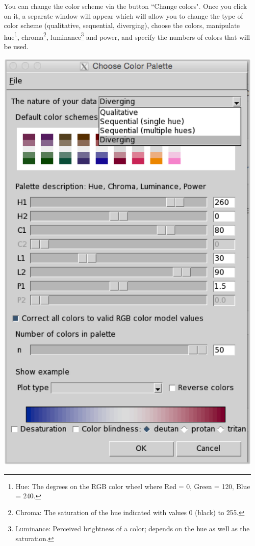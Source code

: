 \documentclass[letterpaper, twocolumn, 9pt]{article}
\begin{document}
You can change the color scheme via the button \textsf{``Change colors"}.
Once you click on it, a separate window will appear which will allow you to change the type of color scheme (qualitative, sequential, diverging), choose the colors, manipulate hue\footnote{Hue: The degrees on the RGB color wheel where Red = 0, Green = 120, Blue = 240.}, chroma\footnote{Chroma: The saturation of the hue indicated with values 0 (black) to 255.}, luminance\footnote{Luminance: Perceived brightness of a color; depends on the hue as well as the saturation.} and power, and specify the numbers of colors that will be used.
\begin{center}
\includegraphics[scale=.4]{figures/ss_colorscheme.png}
\end{center}
\end{document}
